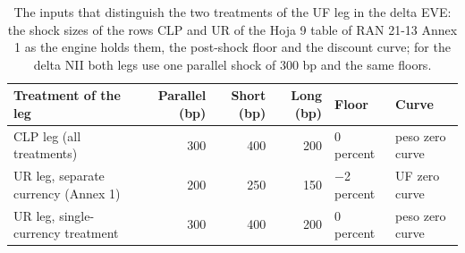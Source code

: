\begin{table}[htbp]
\centering
\footnotesize
\setlength{\tabcolsep}{3.5pt}
\caption{The inputs that distinguish the two treatments of the UF leg in the delta EVE: the shock sizes of the rows CLP and UR of the Hoja 9 table of RAN 21-13 Annex 1 as the engine holds them, the post-shock floor and the discount curve; for the delta NII both legs use one parallel shock of 300 bp and the same floors.}
\label{tab:sizes}
\begin{tabular}{lrrrll}
\toprule
Treatment of the leg & Parallel (bp) & Short (bp) & Long (bp) & Floor & Curve \\
\midrule
CLP leg (all treatments) & 300 & 400 & 200 & 0 percent & peso zero curve \\
UR leg, separate currency (Annex 1) & 200 & 250 & 150 & $-$2 percent & UF zero curve \\
UR leg, single-currency treatment & 300 & 400 & 200 & 0 percent & peso zero curve \\
\bottomrule
\end{tabular}
\end{table}
